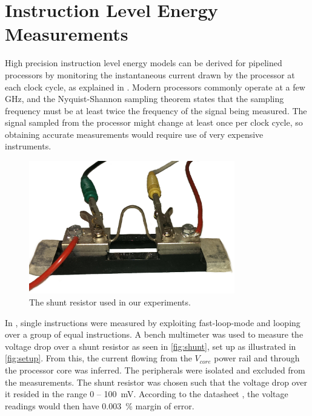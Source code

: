 \section{Instruction Level Energy Measurements}
\label{sec:energymeasure}

High precision instruction level energy models can be derived for pipelined
processors by monitoring the instantaneous current drawn by the processor at
each clock cycle, as explained in \cite{nikolaidis2005instruction}. Modern
processors commonly operate at a few GHz, and the Nyquist-Shannon sampling theorem
\cite{nyquist1928certain} states that the sampling frequency must be at least
twice the frequency of the signal being measured. The signal sampled from the
processor might change at least once per clock cycle, so obtaining accurate
measurements would require use of very expensive instruments.

\begin{figure}[tbh]
    \centering
    \includegraphics[width=0.8\textwidth]{figs/shunt.jpg}
    \caption{The shunt resistor used in our experiments.}
    \label{fig:shunt}
\end{figure}

In \cite{rundehvatum2013exploring}, single instructions were measured by
exploiting fast-loop-mode \cite{a9whitepaper} and looping over a group of equal
instructions. A bench multimeter was used to measure the voltage drop over a
shunt resistor as seen in \autoref{fig:shunt}, set up as illustrated in
\autoref{fig:setup}. From this, the current flowing from the $V_{core}$ power
rail and through the processor core was inferred. The peripherals were isolated
and excluded from the measurements. The shunt resistor was chosen such that the
voltage drop over it resided in the range 0 -- 100~mV. According to the
datasheet \cite{agilent34410a}, the voltage readings would then have 0.003~\%
margin of error.

